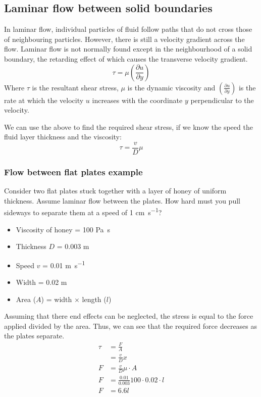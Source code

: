\documentclass[class=report, crop=false, 12pt,a4paper]{standalone}
\begin{document}
\subsection{Laminar flow between solid boundaries}
In laminar flow, individual particles of fluid follow paths that do not cross those of neighbouring particles. However, there is still a velocity gradient across the flow. Laminar flow is not normally found except in the neighbourhood of a solid boundary, the retarding effect of which causes the transverse velocity gradient. 
\begin{equation} 
  \tau = \mu \left( \frac{\partial u}{\partial y} \right)
\end{equation}
Where \(\tau\) is the resultant shear stress, \(\mu\) is the dynamic viscosity and \(\left( \frac{\partial u}{\partial y} \right)\) is the rate at which the velocity \(u\) increases with the coordinate \(y\) perpendicular to the velocity.

We can use the above to find the required shear stress, if we know the speed the fluid layer thickness and the viscosity:
\begin{equation} 
  \tau = \frac{v}{D}\mu
\end{equation}
\subsubsection{Flow between flat plates example}
Consider two flat plates stuck together with a layer of honey of uniform thickness. Assume laminar flow between the plates. How hard must you pull sideways to separate them at a speed of 1 \si{\cm\per\second}?
\begin{itemize}[noitemsep]
  \item Viscosity of honey = 100 \si{\pascal \second}
  \item Thickness \(D\) = 0.003 \si{\meter}
  \item Speed \(v\) = 0.01 \si{\meter\per\second}
  \item Width = 0.02 \si{\meter}
  \item Area (\(A\)) = width \(\times\) length (\(l\))
\end{itemize}
Assuming that there end effects can be neglected, the stress is equal to the force applied divided by the area. Thus, we can see that the required force decreases as the plates separate.
\begin{align}
  \tau &= \frac{F}{A}\\
  &= \frac{v}{D}x\\
  F &= \frac{v}{D}\mu \cdot A\\
  F &= \frac{0.01}{0.003}100 \cdot 0.02 \cdot l\\
  F &=6.6l
\end{align}
\end{document}
